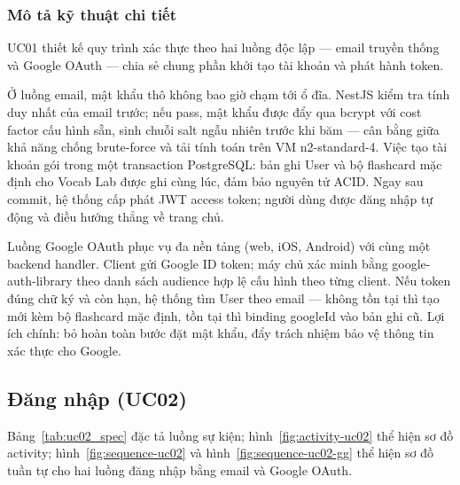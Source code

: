 \subsubsection{Mô tả kỹ thuật chi tiết}

UC01 thiết kế quy trình xác thực theo hai luồng độc lập --- email truyền thống và Google OAuth --- chia sẻ chung phần khởi tạo tài khoản và phát hành token.

Ở luồng email, mật khẩu thô không bao giờ chạm tới ổ đĩa. NestJS kiểm tra tính duy nhất của email trước; nếu pass, mật khẩu được đẩy qua bcrypt với cost factor cấu hình sẵn, sinh chuỗi salt ngẫu nhiên trước khi băm --- cân bằng giữa khả năng chống brute-force và tải tính toán trên VM n2-standard-4. Việc tạo tài khoản gói trong một transaction PostgreSQL: bản ghi User và bộ flashcard mặc định cho Vocab Lab được ghi cùng lúc, đảm bảo nguyên tử ACID. Ngay sau commit, hệ thống cấp phát JWT access token; người dùng được đăng nhập tự động và điều hướng thẳng về trang chủ.

\begin{sloppypar}
Luồng Google OAuth phục vụ đa nền tảng (web, iOS, Android) với cùng một backend handler. Client gửi Google ID token; máy chủ xác minh bằng google-auth-library theo danh sách audience hợp lệ cấu hình theo từng client. Nếu token đúng chữ ký và còn hạn, hệ thống tìm User theo email --- không tồn tại thì tạo mới kèm bộ flashcard mặc định, tồn tại thì binding googleId vào bản ghi cũ. Lợi ích chính: bỏ hoàn toàn bước đặt mật khẩu, đẩy trách nhiệm bảo vệ thông tin xác thực cho Google.
\end{sloppypar}

\subsection{Đăng nhập (UC02)}
Bảng~\ref{tab:uc02_spec} đặc tả luồng sự kiện; hình~\ref{fig:activity-uc02} thể hiện sơ đồ activity; hình~\ref{fig:sequence-uc02} và hình~\ref{fig:sequence-uc02-gg} thể hiện sơ đồ tuần tự cho hai luồng đăng nhập bằng email và Google OAuth.
